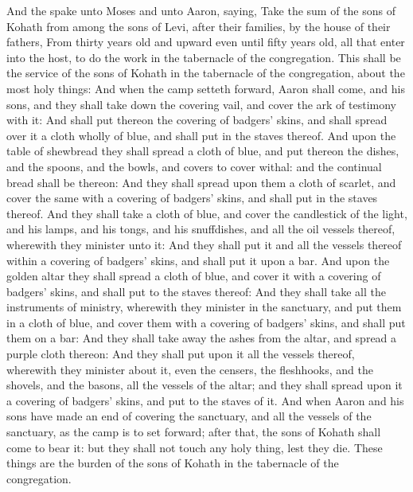 \begin{biblechapter} %
 And the \LORD spake unto Moses and unto Aaron, saying,
\verse Take the sum of the sons of Kohath from among the sons of Levi, after their families, by the house of their fathers,
\verse From thirty years old and upward even until fifty years old, all that enter into the host, to do the work in the tabernacle of the congregation.
\verse This shall be the service of the sons of Kohath in the tabernacle of the congregation, about the most holy things:
\verse And when the camp setteth forward, Aaron shall come, and his sons, and they shall take down the covering vail, and cover the ark of testimony with it:
\verse And shall put thereon the covering of badgers' skins, and shall spread over it a cloth wholly of blue, and shall put in the staves thereof.
\verse And upon the table of shewbread they shall spread a cloth of blue, and put thereon the dishes, and the spoons, and the bowls, and covers to cover withal: and the continual bread shall be thereon:
\verse And they shall spread upon them a cloth of scarlet, and cover the same with a covering of badgers' skins, and shall put in the staves thereof.
\verse And they shall take a cloth of blue, and cover the candlestick of the light, and his lamps, and his tongs, and his snuffdishes, and all the oil vessels thereof, wherewith they minister unto it:
\verse And they shall put it and all the vessels thereof within a covering of badgers' skins, and shall put it upon a bar.
\verse And upon the golden altar they shall spread a cloth of blue, and cover it with a covering of badgers' skins, and shall put to the staves thereof:
\verse And they shall take all the instruments of ministry, wherewith they minister in the sanctuary, and put them in a cloth of blue, and cover them with a covering of badgers' skins, and shall put them on a bar:
\verse And they shall take away the ashes from the altar, and spread a purple cloth thereon:
\verse And they shall put upon it all the vessels thereof, wherewith they minister about it, even the censers, the fleshhooks, and the shovels, and the basons, all the vessels of the altar; and they shall spread upon it a covering of badgers' skins, and put to the staves of it.
\verse And when Aaron and his sons have made an end of covering the sanctuary, and all the vessels of the sanctuary, as the camp is to set forward; after that, the sons of Kohath shall come to bear it: but they shall not touch any holy thing, lest they die. These things are the burden of the sons of Kohath in the tabernacle of the congregation.

\end{biblechapter}
